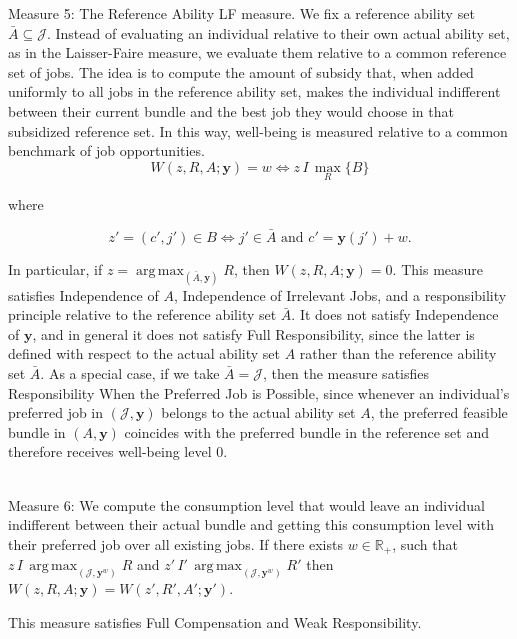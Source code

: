 \documentclass[12pt]{article}
\DeclareMathOperator*{\argmax}{arg\,max}
\begin{document}
{\color{red}
Measure 5: The Reference Ability LF measure. We fix a reference ability set $\bar{A}\subseteq \mathcal{J}$. Instead of evaluating an individual relative to their own actual ability set, as in the Laisser-Faire measure, we evaluate them relative to a common reference set of jobs. The idea is to compute the amount of subsidy that, when added uniformly to all jobs in the reference ability set, makes the individual indifferent between their current bundle and the best job they would choose in that subsidized reference set. In this way, well-being is measured relative to a common benchmark of job opportunities. 
\begin{equation*}
W(z,R,A;\mathbf{y})=w
\Leftrightarrow
z\,I\,\max_R\{B\}
\end{equation*}

where

\begin{equation*}
z'=(c',j')\in B
\Leftrightarrow
j'\in \bar{A}
\textrm{ and }
c'=\mathbf{y}(j')+w.
\end{equation*}

In particular, if $z=\argmax_{(\bar{A},\mathbf{y})}R$, then $W(z,R,A;\mathbf{y})=0$.
This measure satisfies Independence of $A$, Independence of Irrelevant Jobs, and a responsibility principle relative to the reference ability set $\bar{A}$. It does not satisfy Independence of $\mathbf{y}$, and in general it does not satisfy Full Responsibility, since the latter is defined with respect to the actual ability set $A$ rather than the reference ability set $\bar{A}$.  As a special case, if we take $\bar{A}=\mathcal{J}$, then the measure satisfies Responsibility When the Preferred Job is Possible, since whenever an individual's preferred job in $(\mathcal{J},\mathbf{y})$ belongs to the actual ability set $A$, the preferred feasible bundle in $(A,\mathbf{y})$ coincides with the preferred bundle in the reference set and therefore receives well-being level $0$.
}
\\

Measure 6: We compute the consumption level that would leave an individual indifferent between their actual bundle and getting this consumption level with their preferred job over all existing jobs. If there exists $w\in\mathbb{R}_{+}$, such that $z\,I\,\argmax_{(\mathcal{J},\mathbf{y}^w)}R$ and $z'\,I'\,\argmax_{(\mathcal{J},\mathbf{y}^w)}R'$ then $W(z,R,A;\mathbf{y})=W(z',R',A';\mathbf{y}')$.

This measure satisfies Full Compensation and Weak Responsibility.\\
\end{document}

